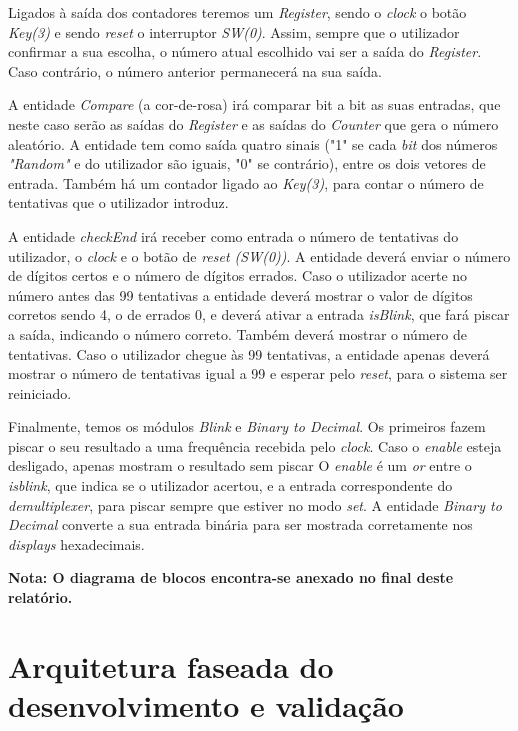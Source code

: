 \documentclass[11pt,openany,twoside]{report}
\begin{document}
Ligados à saída dos contadores teremos um \textit{Register}, sendo o \textit{clock} o botão \textit{Key(3)} e sendo \textit{reset} o interruptor \textit{SW(0)}. Assim, sempre que o utilizador confirmar a sua escolha, o número atual escolhido vai ser a saída do \textit{Register}. Caso contrário, o número anterior permanecerá na sua saída.

A entidade \textit{Compare} (a cor-de-rosa) irá comparar bit a bit as suas entradas, que neste caso serão as saídas do \textit{Register} e as saídas do \textit{Counter} que gera o número aleatório. A entidade tem como saída quatro sinais ("1" se cada \textit{bit} dos números \textit{"Random"} e do utilizador são iguais, "0" se contrário), entre os dois vetores de entrada. Também há um contador ligado ao \textit{Key(3)}, para contar o número de tentativas que o utilizador introduz.

A entidade \textit{checkEnd} irá receber como entrada o número de tentativas do utilizador, o \textit{clock} e o botão de \textit{reset (SW(0))}. A entidade deverá enviar o número de dígitos certos e o número de dígitos errados. Caso o utilizador acerte no número antes das 99 tentativas a entidade deverá mostrar o valor de dígitos corretos sendo 4, o de errados 0, e deverá ativar a entrada \textit{isBlink}, que fará piscar a saída, indicando o número correto. Também deverá mostrar o número de tentativas. Caso o utilizador chegue às 99 tentativas, a entidade apenas deverá mostrar o número de tentativas igual a 99 e esperar pelo \textit{reset}, para o sistema ser reiniciado.

Finalmente, temos os módulos \textit{Blink} e \textit{Binary to Decimal}. Os primeiros fazem piscar o seu resultado a uma frequência recebida pelo \textit{clock}. Caso o \textit{enable} esteja desligado, apenas mostram o resultado sem piscar O \textit{enable} é um \textit{or} entre o \textit{isblink}, que indica se o utilizador acertou, e a entrada correspondente do \textit{demultiplexer}, para piscar sempre que estiver no modo \textit{set}. A entidade \textit{Binary to Decimal} converte a sua entrada binária para ser mostrada corretamente nos \textit{displays} hexadecimais.

\textbf{Nota: O diagrama de blocos encontra-se anexado no final deste relatório.}

\section{Arquitetura faseada do desenvolvimento e validação}
\end{document}
